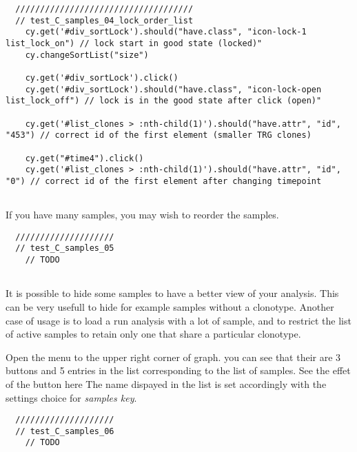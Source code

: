 \begin{verbatim}
  ////////////////////////////////////
  // test_C_samples_04_lock_order_list
    cy.get('#div_sortLock').should("have.class", "icon-lock-1 list_lock_on") // lock start in good state (locked)"
    cy.changeSortList("size")

    cy.get('#div_sortLock').click()
    cy.get('#div_sortLock').should("have.class", "icon-lock-open list_lock_off") // lock is in the good state after click (open)"

    cy.get('#list_clones > :nth-child(1)').should("have.attr", "id", "453") // correct id of the first element (smaller TRG clones)

    cy.get("#time4").click()
    cy.get('#list_clones > :nth-child(1)').should("have.attr", "id", "0") // correct id of the first element after changing timepoint


\end{verbatim}

\bigskip

If you have many samples, you may wish to reorder the samples.

\begin{verbatim}
  ////////////////////
  // test_C_samples_05
    // TODO


\end{verbatim}

It is possible to hide some samples to have a better view of your analysis. This can be very usefull to hide for example samples without a clonotype.
Another case of usage is to load a run analysis with a lot of sample, and to restrict the list of active samples to retain only one that share a particular clonotype.

Open the menu to the upper right corner of graph. you can see that their are 3 buttons and 5 entries in the list corresponding to the list of samples.
See the effet of the button here
The name dispayed in the list is set accordingly with the settings choice for \textit{samples key}.
\begin{verbatim}
  ////////////////////
  // test_C_samples_06
    // TODO


\end{verbatim}

